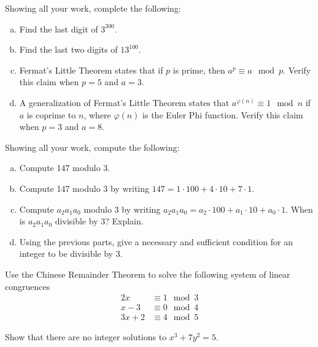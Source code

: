 \documentclass[11pt,letterpaper]{article}
\begin{document}

 Showing all your work, complete the following:
	\begin{enumerate}[(a)]
	\item Find the last digit of $3^{300}$.
	\item Find the last two digits of $13^{100}$.
	\item Fermat's Little Theorem states that if $p$ is prime, then $a^p \equiv a \mod p$. Verify this claim when $p= 5$ and $a= 3$. 
	\item A generalization of Fermat's Little Theorem states that $a^{\varphi(n)} \equiv 1 \mod n$ if $a$ is coprime to $n$, where $\varphi(n)$ is the Euler Phi function. Verify this claim when $p= 3$ and $a= 8$. 
	\end{enumerate}



\newpage



 Showing all your work, compute the following:
	\begin{enumerate}[(a)]
	\item Compute 147 modulo 3. 
	\item Compute 147 modulo 3 by writing $147= 1 \cdot 100 + 4 \cdot 10 + 7 \cdot 1$.
	\item Compute $a_2a_1a_0$ modulo 3 by writing $a_2a_1a_0= a_2 \cdot 100 + a_1 \cdot 10 + a_0 \cdot 1$. When is $a_2a_1a_0$ divisible by 3? Explain.
	\item Using the previous parts, give a necessary and sufficient condition for an integer to be divisible by 3. 
	\end{enumerate}



\newpage



 Use the Chinese Remainder Theorem to solve the following system of linear congruences
	\[
	\begin{aligned}
	2x &\equiv 1 \mod 3 \\
	x - 3&\equiv 0 \mod 4 \\
	3x + 2&\equiv 4 \mod 5
	\end{aligned}
	\]



\newpage



 Show that there are no integer solutions to $x^3 + 7y^2= 5$. 
\end{document}
